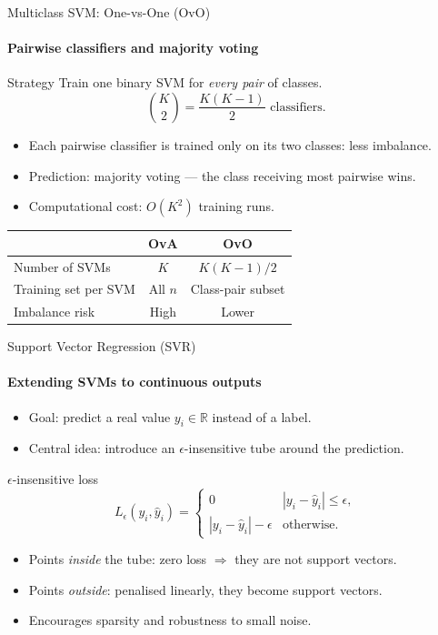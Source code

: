 \begin{frame}{Multiclass SVM: One-vs-One (OvO)}
  \framesubtitle{Pairwise classifiers and majority voting}
  \begin{block}{Strategy}
    Train one binary SVM for \emph{every pair} of classes.
    \[
      \binom{K}{2} = \frac{K(K-1)}{2} \text{ classifiers.}
    \]
  \end{block}
  \begin{itemize}
    \item Each pairwise classifier is trained only on its two classes: less imbalance.
    \item Prediction: \alert{majority voting} — the class receiving most pairwise wins.
    \item Computational cost: $O(K^2)$ training runs.
  \end{itemize}
  \vspace{0.3em}
  \begin{center}
    \begin{tabular}{lcc}
      \toprule
      & OvA & OvO \\
      \midrule
      Number of SVMs & $K$ & $K(K-1)/2$ \\
      Training set per SVM & All $n$ & Class-pair subset \\
      Imbalance risk & High & Lower \\
      \bottomrule
    \end{tabular}
  \end{center}
\end{frame}

\begin{frame}{Support Vector Regression (SVR)}
  \framesubtitle{Extending SVMs to continuous outputs}
  \begin{itemize}
    \item Goal: predict a real value $y_i \in \mathbb{R}$ instead of a label.
    \item Central idea: introduce an \alert{$\epsilon$-insensitive tube} around the prediction.
  \end{itemize}
  \begin{block}{$\epsilon$-insensitive loss}
    \[
      L_\epsilon(y_i, \hat{y}_i) =
      \begin{cases}
        0 & |y_i - \hat{y}_i| \le \epsilon, \\
        |y_i - \hat{y}_i| - \epsilon & \text{otherwise.}
      \end{cases}
    \]
  \end{block}
  \begin{itemize}
    \item Points \emph{inside} the tube: zero loss $\Rightarrow$ they are \alert{not} support vectors.
    \item Points \emph{outside}: penalised linearly, they become support vectors.
    \item Encourages sparsity and robustness to small noise.
  \end{itemize}
\end{frame}

